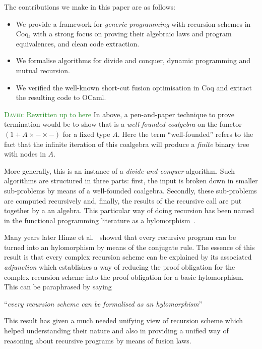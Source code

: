 \documentclass[anonymous, a4paper, UKenglish, cleveref, autoref, thm-restate]{lipics-v2021}
\newcommand{\dcas}[1]{\textcolor{ForestGreen}{\textsc{David}: #1}}
\begin{document}
The contributions we make in this paper are as follows:
\begin{itemize}
  \item We provide a framework for \emph{generic programming} with recursion
    schemes in Coq, with a strong focus on proving their algebraic laws and 
    program equivalences, and clean code extraction.
  \item We formalise algorithms for divide and conquer, dynamic programming and
    mutual recursion.
  \item We verified the well-known short-cut fusion optimisation in Coq and
    extract the resulting code to OCaml.
\end{itemize}

\dcas{Rewritten up to here}
In
 above, a pen-and-paper technique to prove termination would
be to show that  is a \emph{well-founded coalgebra} on the
functor $(1 + A \times - \times -)$ for a fixed type $A$. Here the term
``well-founded'' refers to the fact that the infinite iteration of this
coalgebra will produce a \emph{finite} binary tree with nodes in $A$.

More generally, this is an instance of a \emph{divide-and-conquer} algorithm.
Such algorithms are structured in three parts: first, the input is broken down
in smaller sub-problems by means of a well-founded coalgebra. Secondly, these
sub-problems are computed recursively and, finally, the results of the recursive
call are put together by a an algebra. This particular way of doing recursion
has been named in the functional programming literature as a
hylomorphism~\cite{MeijerFP91, HuIT96}.

Many years later Hinze et al.~\cite{HinzeWG15} showed that every recursive
program can be turned into an hylomorphism by means of the conjugate rule. The
essence of this result is that every complex recursion scheme can be explained
by its associated \emph{adjunction} which establishes a way of reducing the
proof obligation for the complex recursion scheme into the proof obligation for
a basic hylomorphism. This can be paraphrased by saying
\begin{center}
  ``\emph{every recursion scheme can be formalised as an hylomorphism}''
\end{center}

This result has given a much needed unifying view of recursion scheme which
helped understanding their nature and also in providing a unified way of
reasoning about recursive programs by means of fusion laws.
\end{document}
